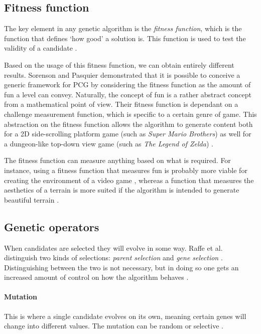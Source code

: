 \subsection{Fitness function}
The key element in any genetic algorithm is the {\em fitness function}, which is the function that defines `how good' a solution is. This function is used to test the validity of a candidate \citep{DBLP:conf/evoW/SorensonP10}. 

Based on the usage of this fitness function, we can obtain entirely different results. Sorenson and Pasquier demonstrated that it is possible to conceive a generic framework for PCG by considering the fitness function as the amount of fun a level can convey. Naturally, the concept of fun is a rather abstract concept from a mathematical point of view. Their fitness function is dependant on a challenge measurement function, which is specific to a certain genre of game. This abstraction on the fitness function allows the algorithm to generate content both for a 2D side-scrolling platform game (such as {\em Super Mario Brothers}) as well for a dungeon-like top-down view game (such as {\em The Legend of Zelda}) \citep{DBLP:conf/evoW/SorensonP10}.

The fitness function can measure anything based on what is required. For instance, using a fitness function that measures fun is probably more viable for creating the environment of a video game \citep{DBLP:conf/evoW/SorensonP10}, whereas a function that measures the aesthetics of a terrain is more suited if the algorithm is intended to generate beautiful terrain \citep{DBLP:conf/cec/WalshG11}.

\subsection{Genetic operators}
When candidates are selected they will evolve in some way. Raffe et al. distinguish two kinds of selections: {\em parent selection} and {\em gene selection} \citep{DBLP:conf/gecco/RaffeZL11}. Distinguishing between the two is not necessary, but in doing so one gets an increased amount of control on how the algorithm behaves \citep{DBLP:conf/gecco/RaffeZL11}.

\paragraph{Mutation} This is where a single candidate evolves on its own, meaning certain genes will change into different values. The mutation can be random or selective \citep{DBLP:conf/ACMace/MouratoSB11}.
